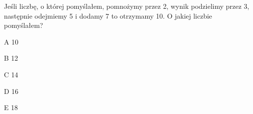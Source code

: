 \begin{tresc}
Jeśli liczbę, o której pomyślałem, pomnożymy przez 2, wynik podzielimy przez 3, następnie odejmiemy 5 i dodamy 7 to otrzymamy 10. O jakiej liczbie pomyślałem?
\end{tresc}
\begin{wariant}{A} 10 \end{wariant}
\begin{wariant}{B} 12 \end{wariant}
\begin{wariant}{C} 14 \end{wariant}
\begin{wariant}{D} 16 \end{wariant}
\begin{wariant}{E} 18 \end{wariant}
